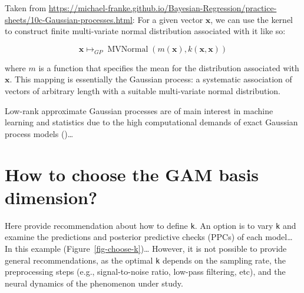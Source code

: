 \documentclass[
  doc,
  floatsintext,
  longtable,
  a4paper,
  nolmodern,
  notxfonts,
  notimes,
  colorlinks=true,linkcolor=blue,citecolor=blue,urlcolor=blue]{apa7}
\begin{document}
Taken from
\url{https://michael-franke.github.io/Bayesian-Regression/practice-sheets/10c-Gaussian-processes.html}:
For a given vector \(\mathbf{x}\), we can use the kernel to construct
finite multi-variate normal distribution associated with it like so:

\[
\mathbf{x} \mapsto_{G P} \operatorname{MVNormal}(m(\mathbf{x}), k(\mathbf{x}, \mathbf{x}))
\]

where \(m\) is a function that specifies the mean for the distribution
associated with \(\mathbf{x}\). This mapping is essentially the Gaussian
process: a systematic association of vectors of arbitrary length with a
suitable multi-variate normal distribution.

Low-rank approximate Gaussian processes are of main interest in machine
learning and statistics due to the high computational demands of exact
Gaussian process models
()\ldots{}

\newpage

\section{How to choose the GAM basis dimension?}\label{sec-basis}

Here provide recommendation about how to define \texttt{k}. An option is
to vary \texttt{k} and examine the predictions and posterior predictive
checks (PPCs) of each model\ldots{} In this example
(Figure~\ref{fig-choose-k})\ldots{} However, it is not possible to
provide general recommendations, as the optimal \texttt{k} depends on
the sampling rate, the preprocessing steps (e.g., signal-to-noise ratio,
low-pass filtering, etc), and the neural dynamics of the phenomenon
under study.
\end{document}
